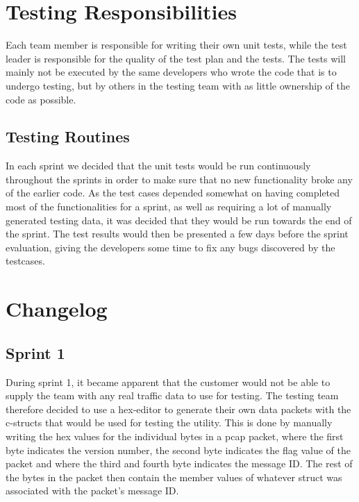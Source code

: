 \section{Testing Responsibilities}
Each team member is responsible for writing their own unit tests, while the test leader is responsible for the quality of the test plan and the tests.
The tests will mainly not be executed by the same developers who wrote the code that is to undergo testing, but by others in the testing team with as little ownership of the code as possible.

\subsection{Testing Routines}
In each sprint we decided that the unit tests would be run continuously throughout the sprints in order to make sure that no new functionality broke any of the earlier code. As the test cases depended somewhat on having completed most of the functionalities for a sprint, as well as requiring a lot of manually generated testing data, it was decided that they would be run towards the end of the sprint. The test results would then be presented a few days before the sprint evaluation, giving the developers some time to fix any bugs discovered by the testcases. 

\section{Changelog}

\subsection{Sprint 1}
During sprint 1, it became apparent that the customer would not be able to supply the team with any real traffic data to use for testing. The testing team therefore decided to use a hex-editor to generate their own data \glspl{packet} with the \Gls{c}-\glspl{struct} that would be used for testing the \gls{utility}. This is done by manually writing the hex values for the individual bytes in a pcap \gls{packet}, where the first byte indicates the version number, the second byte indicates the flag value of the \gls{packet} and where the third and fourth byte indicates the message ID. The rest of the bytes in the \gls{packet} then contain the \gls{member} values of whatever \gls{struct} was associated with the \gls{packet}'s message ID.

